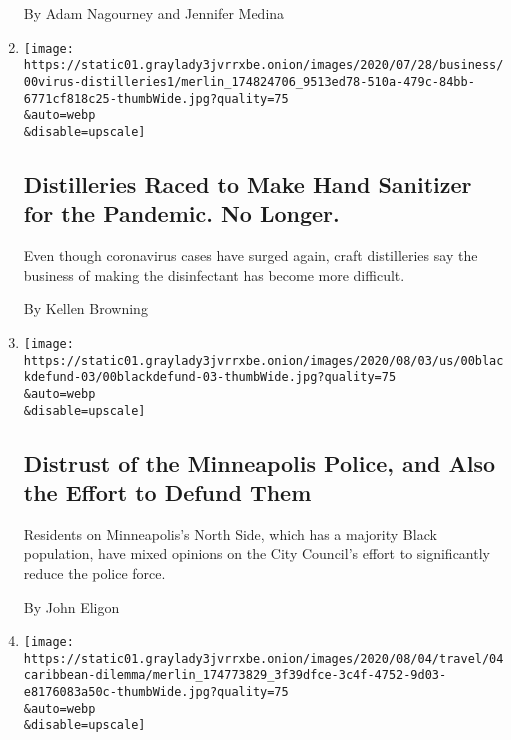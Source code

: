 \begin{enumerate}
  By Adam Nagourney and Jennifer Medina
\item
  \href{/2020/08/04/business/distilleries-hand-sanitizer-pandemic.html}{}

  \texttt{[image: https://static01.graylady3jvrrxbe.onion/images/2020/07/28/business/00virus-distilleries1/merlin\_174824706\_9513ed78-510a-479c-84bb-6771cf818c25-thumbWide.jpg?quality=75\\\&auto=webp\\\&disable=upscale]}

  \hypertarget{distilleries-raced-to-make-hand-sanitizer-for-the-pandemic-no-longer}{%
  \subsection{Distilleries Raced to Make Hand Sanitizer for the
  Pandemic. No
  Longer.}\label{distilleries-raced-to-make-hand-sanitizer-for-the-pandemic-no-longer}}

  Even though coronavirus cases have surged again, craft distilleries
  say the business of making the disinfectant has become more difficult.

  By Kellen Browning
\item
  \href{/2020/08/04/us/minneapolis-defund-police.html}{}

  \texttt{[image: https://static01.graylady3jvrrxbe.onion/images/2020/08/03/us/00blackdefund-03/00blackdefund-03-thumbWide.jpg?quality=75\\\&auto=webp\\\&disable=upscale]}

  \hypertarget{distrust-of-the-minneapolis-police-and-also-the-effort-to-defund-them}{%
  \subsection{Distrust of the Minneapolis Police, and Also the Effort to
  Defund
  Them}\label{distrust-of-the-minneapolis-police-and-also-the-effort-to-defund-them}}

  Residents on Minneapolis's North Side, which has a majority Black
  population, have mixed opinions on the City Council's effort to
  significantly reduce the police force.

  By John Eligon
\item
  \href{/2020/08/04/travel/coronavirus-caribbean-vacations.html}{}

  \texttt{[image: https://static01.graylady3jvrrxbe.onion/images/2020/08/04/travel/04caribbean-dilemma/merlin\_174773829\_3f39dfce-3c4f-4752-9d03-e8176083a50c-thumbWide.jpg?quality=75\\\&auto=webp\\\&disable=upscale]}

  \hypertarget{the-caribbean-dilemma}{%
}
\end{enumerate}

